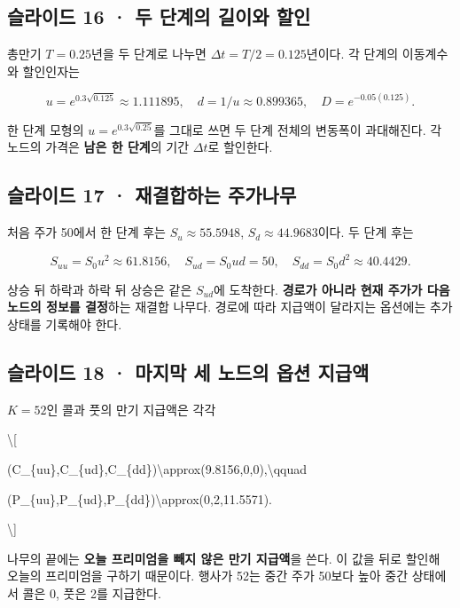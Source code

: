 \documentclass[11pt,a4paper]{article}
\begin{document}
\subsection{슬라이드 16 · 두 단계의 길이와 할인}
총만기 $T=0.25$년을 두 단계로 나누면 $\Delta t=T/2=0.125$년이다. 각 단계의 이동계수와 할인인자는\par

\[
u=e^{0.3\sqrt{0.125}}\approx1.111895,\quad
d=1/u\approx0.899365,\quad
D=e^{-0.05(0.125)}.
\]

한 단계 모형의 $u=e^{0.3\sqrt{0.25}}$를 그대로 쓰면 두 단계 전체의 변동폭이 과대해진다. 각 노드의 가격은 \textbf{남은 한 단계}의 기간 $\Delta t$로 할인한다.\par

\subsection{슬라이드 17 · 재결합하는 주가나무}
처음 주가 50에서 한 단계 후는 $S_u\approx55.5948$, $S_d\approx44.9683$이다. 두 단계 후는\par

\[
S_{uu}=S_0u^2\approx61.8156,\quad
S_{ud}=S_0ud=50,\quad
S_{dd}=S_0d^2\approx40.4429.
\]

상승 뒤 하락과 하락 뒤 상승은 같은 $S_{ud}$에 도착한다. \textbf{경로가 아니라 현재 주가가 다음 노드의 정보를 결정}하는 재결합 나무다. 경로에 따라 지급액이 달라지는 옵션에는 추가 상태를 기록해야 한다.\par

\subsection{슬라이드 18 · 마지막 세 노드의 옵션 지급액}
$K=52$인 콜과 풋의 만기 지급액은 각각\par

\textbackslash{}[\par
(C\_\{uu\},C\_\{ud\},C\_\{dd\})\textbackslash{}approx(9.8156,0,0),\textbackslash{}qquad\par
(P\_\{uu\},P\_\{ud\},P\_\{dd\})\textbackslash{}approx(0,2,11.5571).\par
\textbackslash{}]\par

나무의 끝에는 \textbf{오늘 프리미엄을 빼지 않은 만기 지급액}을 쓴다. 이 값을 뒤로 할인해 오늘의 프리미엄을 구하기 때문이다. 행사가 52는 중간 주가 50보다 높아 중간 상태에서 콜은 0, 풋은 2를 지급한다.\par
\end{document}
